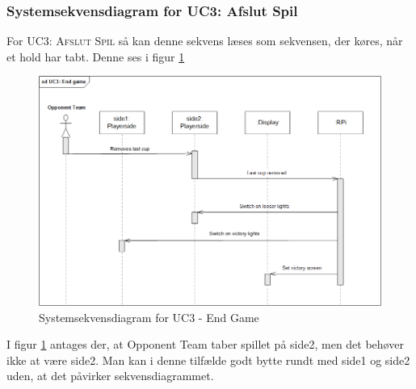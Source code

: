 \documentclass[Rapport/Rapport_main.tex]{subfiles}
\begin{document}
\subsubsection{Systemsekvensdiagram for UC3: Afslut Spil}
For \textsc{UC3: Afslut Spil} så kan denne sekvens læses som sekvensen, der køres, når et hold har tabt. Denne ses i figur \ref{fig:rap_sd_UC3}
\begin{figure}[H]
    \centering 
    \includegraphics[width=\textwidth]{Arkitektur/Sekvensdiagrammer/graphics/sd_UC3.png}
    \caption{Systemsekvensdiagram for UC3 - End Game}
    \label{fig:rap_sd_UC3}
\end{figure}
I figur \ref{fig:rap_sd_UC3} antages der, at Opponent Team taber spillet på side2, men det behøver ikke at være side2. Man kan i denne tilfælde godt bytte rundt med side1 og side2 uden, at det påvirker sekvensdiagrammet.
\end{document}
